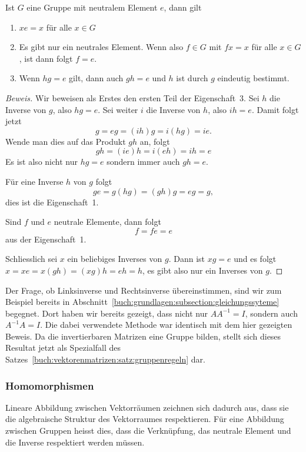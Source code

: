 \begin{satz}
\label{buch:vektorenmatrizen:satz:gruppenregeln}
Ist $G$ eine Gruppe mit neutralem Element $e$, dann gilt
\begin{enumerate}
\item
$xe=x$ für alle $x\in G$
\item
Es gibt nur ein neutrales Element.
%
Wenn also $f\in G$ mit $fx=x$ für alle $x\in G$, ist dann folgt $f=e$.
\item 
Wenn $hg=e$ gilt, dann auch $gh=e$ und $h$ ist durch $g$ eindeutig bestimmt.
\end{enumerate}
\end{satz}

\begin{proof}[Beweis]
Wir beweisen als Erstes den ersten Teil der Eigenschaft~3.
Sei $h$ die Inverse von $g$, also $hg=e$.
Sei weiter $i$ die Inverse von $h$, also $ih=e$.
Damit folgt jetzt
\[
g
=
eg
=
(ih)g
=
i(hg)
=
ie.
\]
Wende man dies auf das Produkt $gh$ an, folgt
\[
gh
=
(ie)h
=
i(eh)
=
ih
=
e
\]
Es ist also nicht nur $hg=e$ sondern immer auch $gh=e$.

Für eine Inverse $h$ von $g$ folgt
\[
ge
=
g(hg)
=
(gh)g
=
eg
=
g,
\]
dies ist die Eigenschaft~1.

Sind $f$ und $e$ neutrale Elemente, dann folgt
\[
f = fe = e
\]
aus der Eigenschaft~1.

Schliesslich sei $x$ ein beliebiges Inverses von $g$.
Dann ist $xg=e$ und es folgt
$x=xe=x(gh)=(xg)h = eh = h$, es gibt also nur ein Inverses von $g$.
\end{proof}

Der Frage, ob Linksinverse und Rechtsinverse übereinstimmen,
sind wir zum Beispiel bereits in
Abschnitt~\ref{buch:grundlagen:subsection:gleichungssyteme}
begegnet.
Dort haben wir bereits gezeigt, dass nicht nur $AA^{-1}=I$,
sondern auch $A^{-1}A=I$.
Die dabei verwendete Methode war identisch mit dem hier gezeigten
Beweis.
Da die invertierbaren Matrizen eine Gruppe bilden, stellt sich
dieses Resultat jetzt als Spezialfall des
Satzes~\ref{buch:vektorenmatrizen:satz:gruppenregeln} dar.

\subsubsection{Homomorphismen} \label{buch:gruppen:subsection:homomorphismen}
Lineare Abbildung zwischen Vektorräumen zeichnen sich dadurch aus,
dass sie die algebraische Struktur des Vektorraumes respektieren.
Für eine Abbildung zwischen Gruppen heisst dies, dass die Verknüpfung,
das neutrale Element und die Inverse respektiert werden müssen.

